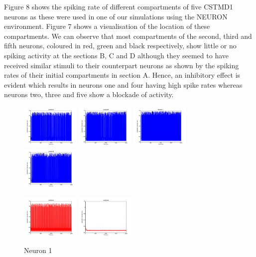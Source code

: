 \documentclass[a4paper,11pt]{article}
\begin{document}
Figure 8 shows the spiking rate of different compartments of five CSTMD1 neurons as these were used in one of our simulations using the NEURON environment. Figure 7 shows a visualisation of the location of these compartments. We can observe that most compartments of the second, third and fifth neurons, coloured in red, green and black respectively, show little or no spiking activity at the sections B, C and D although they seemed to have received similar stimuli to their counterpart neurons as shown by the spiking rates of their initial compartments in section A. Hence, an inhibitory effect is evident which results in neurons one and four having high spike rates whereas neurons two, three and five show a blockade of activity.
\newpage
\begin{figure}[H]
\centering
\begin{minipage}{0.18\textwidth}
\includegraphics[width = 1.1in]{cstmd_comp0}
\includegraphics[width = 1.1in]{cstmd_comp1}
\includegraphics[width = 1.1in]{cstmd_comp2} 
\includegraphics[width = 1.1in]{cstmd_comp3}
\caption* {Neuron 1}
\end{minipage}
\begin{minipage}{0.18\textwidth}
\includegraphics[width = 1.1in]{cstmd_comp4} 
\includegraphics[width = 1.1in]{cstmd_comp5} 

\end{minipage}
\end{figure}
\end{document}
